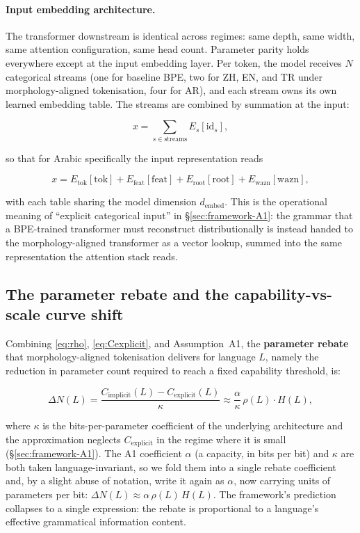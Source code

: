 \paragraph{Input embedding architecture.}
The transformer downstream is identical across regimes: same depth, same width, same attention configuration, same head count. Parameter parity holds everywhere except at the input embedding layer. Per token, the model receives $N$ categorical streams (one for baseline BPE, two for ZH, EN, and TR under morphology-aligned tokenisation, four for AR), and each stream owns its own learned embedding table. The streams are combined by summation at the input:

\begin{equation}
x = \sum_{s \in \mathrm{streams}} E_s[\mathrm{id}_s],
\label{eq:embedsum}
\end{equation}

so that for Arabic specifically the input representation reads

\[
x = E_{\mathrm{tok}}[\mathrm{tok}] + E_{\mathrm{feat}}[\mathrm{feat}] + E_{\mathrm{root}}[\mathrm{root}] + E_{\mathrm{wazn}}[\mathrm{wazn}],
\]

with each table sharing the model dimension $d_{\mathrm{embed}}$. This is the operational meaning of ``explicit categorical input'' in \S\ref{sec:framework-A1}: the grammar that a BPE-trained transformer must reconstruct distributionally is instead handed to the morphology-aligned transformer as a vector lookup, summed into the same representation the attention stack reads.

\subsection{The parameter rebate and the capability-vs-scale curve shift}
\label{sec:framework-rebate}

Combining \ref{eq:rho}, \ref{eq:Cexplicit}, and Assumption~A1, the \textbf{parameter rebate} that morphology-aligned tokenisation delivers for language $L$, namely the reduction in parameter count required to reach a fixed capability threshold, is:

\begin{equation}
\Delta N(L) = \frac{C_{\mathrm{implicit}}(L) - C_{\mathrm{explicit}}(L)}{\kappa} \approx \frac{\alpha}{\kappa}\, \rho(L) \cdot H(L),
\label{eq:rebate}
\end{equation}

where $\kappa$ is the bits-per-parameter coefficient of the underlying architecture and the approximation neglects $C_{\mathrm{explicit}}$ in the regime where it is small (\S\ref{sec:framework-A1}). The A1 coefficient $\alpha$ (a capacity, in bits per bit) and $\kappa$ are both taken language-invariant, so we fold them into a single rebate coefficient and, by a slight abuse of notation, write it again as $\alpha$, now carrying units of parameters per bit: $\Delta N(L) \approx \alpha\,\rho(L)\,H(L)$. The framework's prediction collapses to a single expression: the rebate is proportional to a language's effective grammatical information content.

